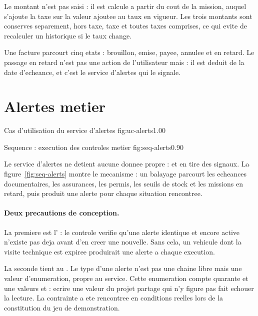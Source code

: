 Le montant n'est pas saisi : il est calcule a partir du cout de la
mission, auquel s'ajoute la taxe sur la valeur ajoutee au taux en
vigueur. Les trois montants sont conserves separement, hors taxe, taxe et
toutes taxes comprises, ce qui evite de recalculer un historique si le
taux change.

Une facture parcourt cinq etats : brouillon, emise, payee, annulee et en
retard. Le passage en retard n'est pas une action de l'utilisateur mais
 : il est deduit de la date
d'echeance, et c'est le service d'alertes qui le signale.

\section{Alertes metier}

  {Cas d'utilisation du service d'alertes}
  {fig:uc-alerts}{1.00}

  {Sequence : execution des controles metier}
  {fig:seq-alerts}{0.90}

Le service d'alertes ne detient aucune donnee propre :  et en tire des signaux. La
figure~\ref{fig:seq-alerts} montre le mecanisme : un balayage parcourt
les echeances documentaires, les assurances, les permis, les seuils de
stock et les missions en retard, puis produit une alerte pour chaque
situation rencontree.

\paragraph{Deux precautions de conception.}
La premiere est l' : le controle verifie
qu'une alerte identique et encore active n'existe pas deja avant d'en
creer une nouvelle. Sans cela, un vehicule dont la visite technique est
expiree produirait une alerte a chaque execution.

La seconde tient au . Le type d'une alerte n'est
pas une chaine libre mais une valeur d'enumeration, propre au service.
Cette enumeration compte quarante et une valeurs et  : ecrire une valeur du projet partage qui n'y
figure pas fait echouer la lecture. La contrainte a ete rencontree en
conditions reelles lors de la constitution du jeu de demonstration.

